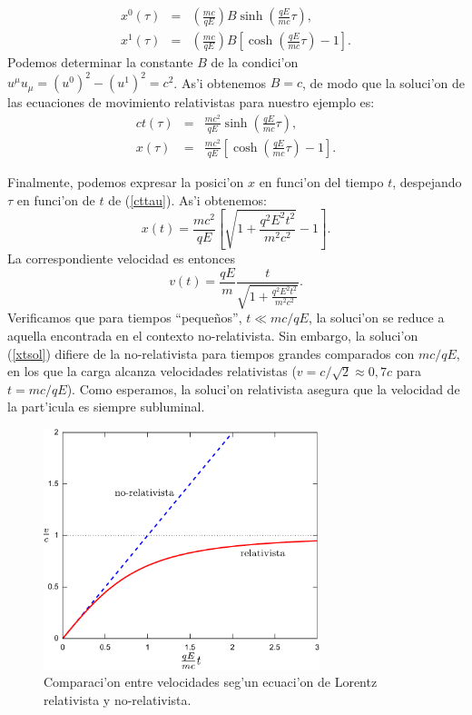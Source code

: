 \begin{eqnarray}
x^0(\tau)&=&\left(\frac{mc}{qE}\right)B\sinh\left(\frac{qE}{mc}\tau\right) ,\\
x^1(\tau)&=&\left(\frac{mc}{qE}\right)B\left[\cosh\left(
\frac{qE}{mc}\tau\right)-1\right] .
\end{eqnarray}
Podemos determinar la constante $B$ de la condici'on $u^\mu
u_\mu=(u^0)^2-(u^1)^2=c^2$. As'i obtenemos $B=c$, de modo que la
soluci'on de las ecuaciones de movimiento relativistas para nuestro ejemplo es:
\begin{eqnarray}
ct(\tau)&=&\frac{mc^2}{qE}\sinh\left( \frac{qE}{mc}\tau\right), \label{cttau}\\
x(\tau)&=&\frac{mc^2}{qE}\left[ \cosh\left( \frac{qE}{mc}\tau\right)-1\right] .
\end{eqnarray}

Finalmente, podemos expresar la posici'on $x$ en funci'on del tiempo $t$,
despejando $\tau$ en funci'on de $t$ de (\ref{cttau}). As'i obtenemos:
\begin{equation}
x(t) = \frac{mc^2}{qE} \left[ \sqrt{1 + \frac{q^2 E^2 t^2}{m^2c^2}} - 1 \right].
\label{xtsol}
\end{equation}
La correspondiente velocidad es entonces
\begin{equation}
v(t) = \frac{qE}{m}\frac{t}{\sqrt{1 + \frac{q^2 E^2 t^2}{m^2c^2}}}.
\end{equation}
Verificamos que para tiempos ``peque\~nos'', $t\ll {mc}/{qE}$, la soluci'on se
reduce a aquella encontrada en el contexto no-relativista. Sin embargo, la
soluci'on (\ref{xtsol}) difiere de la no-relativista para tiempos grandes
comparados con ${mc}/{qE}$, en los que la carga alcanza velocidades
relativistas ($v={c}/{\sqrt{2}}\approx 0,7c$ para $t={mc}/{qE}$). Como esperamos, la soluci'on relativista asegura que la velocidad de la part'icula es siempre subluminal.

\begin{center}
\begin{figure}[H]
\centerline{\includegraphics[height=7cm]{fig/fig-trayectoria-1D-rel-norel.pdf}}
\caption{Comparaci'on entre velocidades seg'un ecuaci'on de Lorentz relativista y no-relativista.}
\label{fig:relnorel}
\end{figure}
\end{center}


